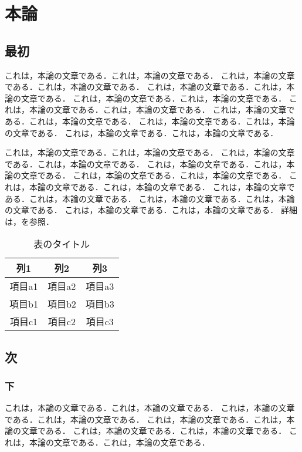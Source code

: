 \chapter{本論} \label{chap:main_chapter}

\section{最初}

これは，本論の文章である．これは，本論の文章である．
これは，本論の文章である．これは，本論の文章である．
これは，本論の文章である．これは，本論の文章である．
これは，本論の文章である．これは，本論の文章である．
これは，本論の文章である．これは，本論の文章である．
これは，本論の文章である．これは，本論の文章である．
これは，本論の文章である．これは，本論の文章である．
これは，本論の文章である．これは，本論の文章である．

これは，本論の文章である．これは，本論の文章である．
これは，本論の文章である．これは，本論の文章である．
これは，本論の文章である．これは，本論の文章である．
これは，本論の文章である．これは，本論の文章である．
これは，本論の文章である．これは，本論の文章である．
これは，本論の文章である．これは，本論の文章である．
これは，本論の文章である．これは，本論の文章である．
これは，本論の文章である．これは，本論の文章である．
詳細は，を参照．

\begin{table}[btp]
 \caption{\label{table:sample}表のタイトル}
 \begin{center}
  \begin{tabular}{ccc}
   \hline
   列1 & 列2 & 列3 \\
   \hline
   項目a1 & 項目a2 & 項目a3 \\
   項目b1 & 項目b2 & 項目b3 \\
   項目c1 & 項目c2 & 項目c3 \\
   \hline
  \end{tabular} 
 \end{center}
\end{table}

\section{次}

\subsection{下}

これは，本論の文章である．これは，本論の文章である．
これは，本論の文章である．これは，本論の文章である．
これは，本論の文章である．これは，本論の文章である．
これは，本論の文章である．これは，本論の文章である．
これは，本論の文章である．これは，本論の文章である．

